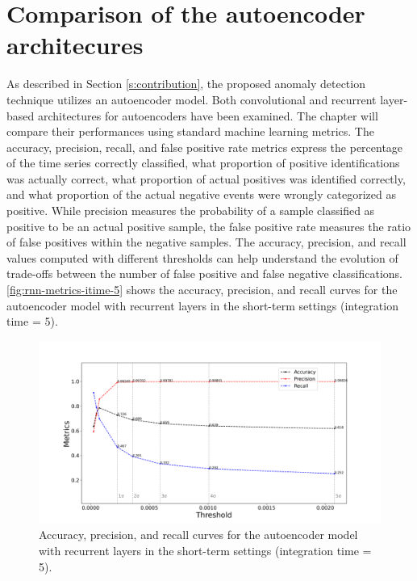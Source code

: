 \section{Comparison of the autoencoder architecures}
\label{s:Acc-Fpr}
As described in Section \autoref{s:contribution}, the proposed anomaly detection technique utilizes an autoencoder model. Both convolutional and recurrent layer-based architectures for autoencoders have been examined. The chapter will compare their performances using standard machine learning metrics. The accuracy, precision, recall, and false positive rate metrics express the percentage of the time series correctly classified, what proportion of positive identifications was actually correct, what proportion of actual positives was identified correctly, and what proportion of the actual negative events were wrongly categorized as positive. While precision measures the probability of a sample classified as positive to be an actual positive sample, the false positive rate measures the ratio of false positives within the negative samples. The accuracy, precision, and recall values computed with different thresholds can help understand the evolution of trade-offs between the number of false positive and false negative classifications. \autoref{fig:rnn-metrics-itime-5} shows the accuracy, precision, and recall curves for the autoencoder model with recurrent layers in the short-term settings (integration time = 5). 
\begin{figure}[!htb]
    \centering
    \includegraphics[width=\linewidth]{figures/experiments/metrics/rnn_metrics_test_set_all_itime_5.png}
    \captionsetup{width=0.9\linewidth}
    \caption{Accuracy, precision, and recall curves for the autoencoder model with recurrent layers in the short-term settings (integration time = 5).}
    \label{fig:rnn-metrics-itime-5}
\end{figure}
